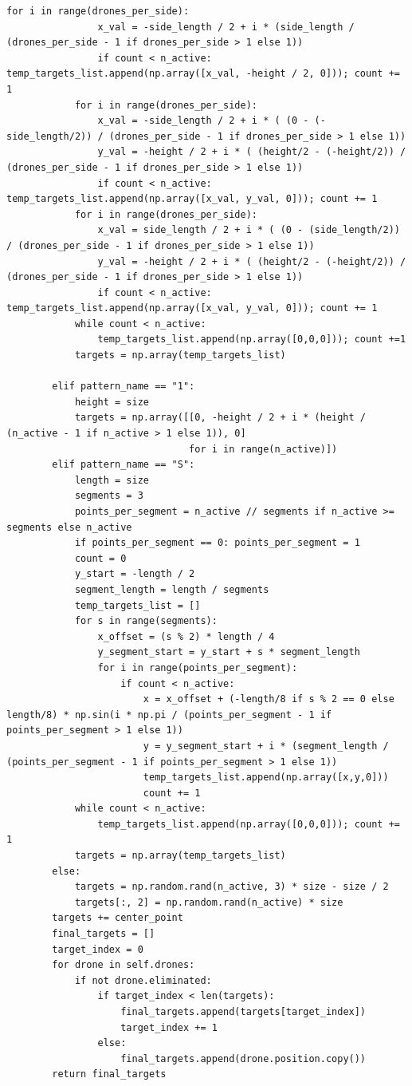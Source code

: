 \documentclass[11pt]{article}
\begin{document}
\begin{lstlisting}[style=pythonstyle]
            for i in range(drones_per_side):
                x_val = -side_length / 2 + i * (side_length / (drones_per_side - 1 if drones_per_side > 1 else 1))
                if count < n_active: temp_targets_list.append(np.array([x_val, -height / 2, 0])); count += 1
            for i in range(drones_per_side):
                x_val = -side_length / 2 + i * ( (0 - (-side_length/2)) / (drones_per_side - 1 if drones_per_side > 1 else 1))
                y_val = -height / 2 + i * ( (height/2 - (-height/2)) / (drones_per_side - 1 if drones_per_side > 1 else 1))
                if count < n_active: temp_targets_list.append(np.array([x_val, y_val, 0])); count += 1
            for i in range(drones_per_side):
                x_val = side_length / 2 + i * ( (0 - (side_length/2)) / (drones_per_side - 1 if drones_per_side > 1 else 1))
                y_val = -height / 2 + i * ( (height/2 - (-height/2)) / (drones_per_side - 1 if drones_per_side > 1 else 1))
                if count < n_active: temp_targets_list.append(np.array([x_val, y_val, 0])); count += 1
            while count < n_active:
                temp_targets_list.append(np.array([0,0,0])); count +=1
            targets = np.array(temp_targets_list)

        elif pattern_name == "1":
            height = size
            targets = np.array([[0, -height / 2 + i * (height / (n_active - 1 if n_active > 1 else 1)), 0]
                                for i in range(n_active)])
        elif pattern_name == "S":
            length = size
            segments = 3
            points_per_segment = n_active // segments if n_active >= segments else n_active
            if points_per_segment == 0: points_per_segment = 1
            count = 0
            y_start = -length / 2
            segment_length = length / segments
            temp_targets_list = []
            for s in range(segments):
                x_offset = (s % 2) * length / 4
                y_segment_start = y_start + s * segment_length
                for i in range(points_per_segment):
                    if count < n_active:
                        x = x_offset + (-length/8 if s % 2 == 0 else length/8) * np.sin(i * np.pi / (points_per_segment - 1 if points_per_segment > 1 else 1))
                        y = y_segment_start + i * (segment_length / (points_per_segment - 1 if points_per_segment > 1 else 1))
                        temp_targets_list.append(np.array([x,y,0]))
                        count += 1
            while count < n_active:
                temp_targets_list.append(np.array([0,0,0])); count += 1
            targets = np.array(temp_targets_list)
        else:
            targets = np.random.rand(n_active, 3) * size - size / 2
            targets[:, 2] = np.random.rand(n_active) * size
        targets += center_point
        final_targets = []
        target_index = 0
        for drone in self.drones:
            if not drone.eliminated:
                if target_index < len(targets):
                    final_targets.append(targets[target_index])
                    target_index += 1
                else:
                    final_targets.append(drone.position.copy())
        return final_targets


\end{lstlisting}
\end{document}
